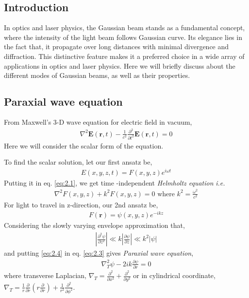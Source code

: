 \documentclass[11pt,a4paper]{article}
\numberwithin{equation}{section}
\begin{document}
\subsection{Introduction}
In optics and laser physics, the Gaussian beam stands as a fundamental concept, where the intensity of the light beam follows Gaussian curve. Its elegance lies in the fact that, it propagate over long distances with minimal divergence and diffraction. This distinctive feature makes it a preferred choice in a wide array of applications in optics and laser physics. Here we will briefly discuss about the different modes of Gaussian beams, as well as their properties.

\subsection{Paraxial wave equation}
From Maxwell's 3-D wave equation for electric field in vacuum,
\begin{align}
	\nabla^2\boldsymbol{E}(\boldsymbol{r},t) - \frac{1}{c^2}\frac{\partial^2}{\partial t^2}\boldsymbol{E}(\boldsymbol{r},t)=0 \label{eq:2.1}
\end{align}
Here we will consider the scalar form of the equation.

To find the scalar solution, let our first ansatz be,
\begin{align}
	{E}(x,y,z,t)= {F}(x,y,z) e^{i\omega t} \label{eq:2.2}
\end{align}
Putting it in eq. \ref{eq:2.1}, we get time -independent \textit{Helmholtz equation} \textit{i.e.} 
\begin{align}
	\nabla^2{F}(x,y,z) + k^2{F}(x,y,z)=0
	\text{ where }k^2 = \frac{\omega^2}{c^2} \label{eq:2.3}
\end{align}
For light to travel in z-direction, our 2nd ansatz be,
\begin{align}
	{F}(\boldsymbol{r}) = \psi(x,y,z)e^{-ikz}  \label{eq:2.4} 
\end{align}
Considering the slowly varying envelope approximation\cite{WO} that,
\begin{align}
	\left|\frac{\partial^2\psi}{\partial z^2}\right|\ll
	k \left|\frac{\partial\psi}{\partial z}\right| \ll
	k^2\left|\psi\right| \label{eq:2.5}
\end{align}
and putting \ref{eq:2.4} in eq. \ref{eq:2.3} gives \textit{Paraxial wave equation},
\begin{align}
	\nabla_T ^2\psi -2ik \frac{\partial\psi}{\partial r}=0 \label{eq:2.6}
\end{align}
where transverse Laplacian, $\displaystyle\nabla_T = \frac{\partial^2}{\partial x^2}+\frac{\partial^2}{\partial y^2}$ or in cylindrical coordinate, $\displaystyle\nabla_T = \frac{1}{r}\frac{\partial}{\partial r}\left(r\frac{\partial}{\partial r}\right) + \frac{1}{r^2}\frac{\partial^2}{\partial \phi^2}$.
\end{document}
